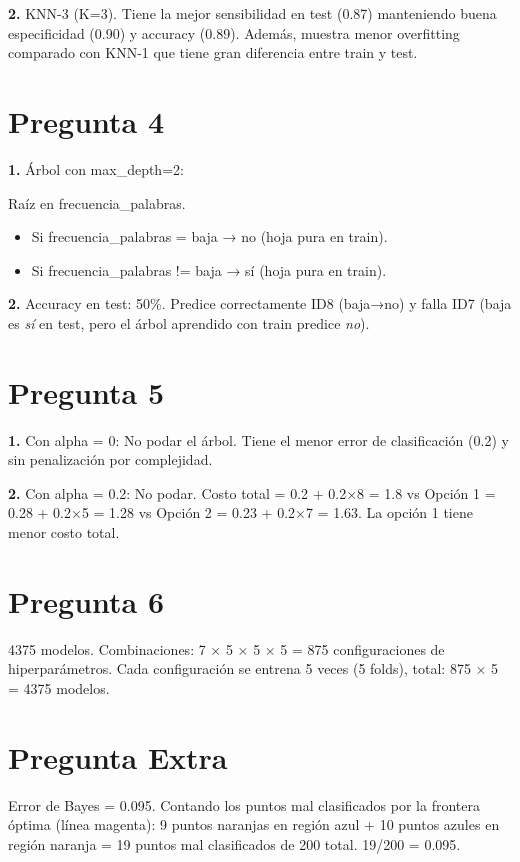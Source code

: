 \documentclass[12pt]{article}
\begin{document}
\textbf{2.} KNN-3 (K=3). Tiene la mejor sensibilidad en test (0.87) manteniendo buena especificidad (0.90) y accuracy (0.89). Además, muestra menor overfitting comparado con KNN-1 que tiene gran diferencia entre train y test.

\section{Pregunta 4}

\textbf{1.} Árbol con max\_depth=2:

Raíz en frecuencia\_palabras.
\begin{itemize}[nosep]
    \item Si frecuencia\_palabras = baja → no (hoja pura en train).
    \item Si frecuencia\_palabras != baja → sí (hoja pura en train).
\end{itemize}

\textbf{2.} Accuracy en test: 50\%. Predice correctamente ID8 (baja→no) y falla ID7 (baja es \emph{sí} en test, pero el árbol aprendido con train predice \emph{no}).

\section{Pregunta 5}

\textbf{1.} Con alpha = 0: No podar el árbol. Tiene el menor error de clasificación (0.2) y sin penalización por complejidad.

\textbf{2.} Con alpha = 0.2: No podar. Costo total = 0.2 + 0.2×8 = 1.8 vs Opción 1 = 0.28 + 0.2×5 = 1.28 vs Opción 2 = 0.23 + 0.2×7 = 1.63. La opción 1 tiene menor costo total.

\section{Pregunta 6}

4375 modelos. Combinaciones: 7 × 5 × 5 × 5 = 875 configuraciones de hiperparámetros. Cada configuración se entrena 5 veces (5 folds), total: 875 × 5 = 4375 modelos.

\section{Pregunta Extra}

Error de Bayes = 0.095. Contando los puntos mal clasificados por la frontera óptima (línea magenta): 9 puntos naranjas en región azul + 10 puntos azules en región naranja = 19 puntos mal clasificados de 200 total. 19/200 = 0.095.
\end{document}
